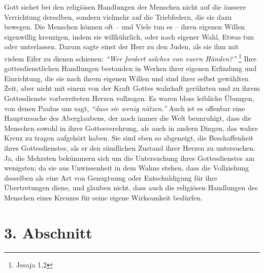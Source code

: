   Gott siehet bei den religiösen
Handlungen der Menschen nicht auf die äussere
Verrichtung derselben, sondern vielmehr auf die Triebfedern, die sie dazu
bewegen.  Die Menschen können oft -- und Viele
tun es -- ihren eigenen Willen
eigenwillig kreuzigen, indem sie willkührlich, oder nach eigener Wahl, Etwas
tun oder
unterlassen. Darum sagte einst der Herr zu den Juden, als sie ihm
mit vielem
Eifer zu dienen schienen:
\textit{"`Wer fordert solches von euern Händen?"'}
\footnote{Jesaja 1,2}
 Ihre
gottesdienstlichen Handlungen bestanden in Werken ihrer eigenen Erfindung und
Einrichtung, die sie nach ihrem eigenen Willen und sind ihrer selbst gewählten
Zeit, aber nicht mit einem von der Kraft Gottes wahrhaft gerührten und zu ihrem
Gottesdienste vorbereiteten Herzen vollzogen. Es waren bloss leibliche Übungen,
von denen
Paulus uns sagt,
\textit{"`dass sie wenig nützen."'} Auch ist es offenbar eine
Hauptursache des Aberglaubens, der noch
immer die Welt beunruhigt, dass die Menschen sowohl in ihrer Gottesverehrung,
als auch in andern Dingen, das wahre Kreuz zu tragen aufgehört haben. Sie sind
eben so abgeneigt, die Beschaffenheit ihres Gottesdienstes, als er den
sündlichen Zustand ihrer Herzen zu untersuchen. Ja,
die Mehrsten bekümmern sich um die Untersuchung ihres Gottesdienstes am
wenigsten; da sie aus Unwissenheit in
dem Wahne stehen, dass die Vollziehung desselben als eine Art von Genugtuung
oder Entschuldigung für ihre Übertretungen diene, und glauben nicht, dass auch
die religiösen Handlungen des Menschen eines Kreuzes für seine eigene
Wirksamkeit bedürfen.

\section{3. Abschnitt} \label{kap6_ab3}

